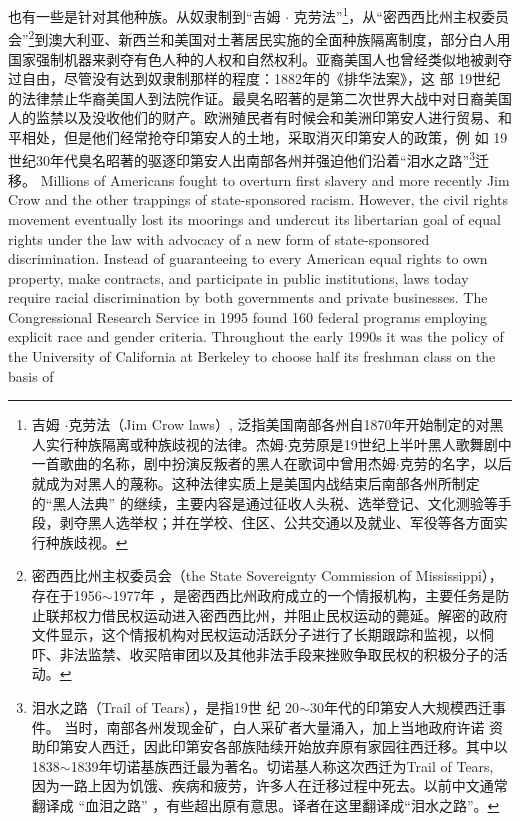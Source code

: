 \begin{paracol}{2}
也有一些是针对其他种族。从奴隶制到“吉姆 $\cdot$ 克劳法”\footnote{吉姆 $\cdot$克劳法（Jim Crow laws）, 泛指美国南部各州自1870年开始制定的对黑人实行种族隔离或种族歧视的法律。杰姆$\cdot$克劳原是19世纪上半叶黑人歌舞剧中一首歌曲的名称，剧中扮演反叛者的黑人在歌词中曾用杰姆$\cdot$克劳的名字，以后就成为对黑人的蔑称。这种法律实质上是美国内战结束后南部各州所制定的“黑人法典” 的继续，主要内容是通过征收人头税、选举登记、文化测验等手段，剥夺黑人选举权；并在学校、住区、公共交通以及就业、军役等各方面实行种族歧视。}，从“密西西比州主权委员会”\footnote{密西西比州主权委员会（the State Sovereignty Commission of Mississippi），存在于1956$\sim$1977年 ，是密西西比州政府成立的一个情报机构，主要任务是防止联邦权力借民权运动进入密西西比州，并阻止民权运动的薨延。解密的政府文件显示，这个情报机构对民权运动活跃分子进行了长期跟踪和监视，以恫吓、非法监禁、收买陪审团以及其他非法手段来挫败争取民权的积极分子的活动。}到澳大利亚、新西兰和美国对土著居民实施的全面种族隔离制度，部分白人用国家强制机器来剥夺有色人种的人权和自然权利。亚裔美国人也曾经类似地被剥夺过自由，尽管没有达到奴隶制那样的程度：1882年的《排华法案》，这 部 19世纪的法律禁止华裔美国人到法院作证。最臭名昭著的是第二次世界大战中对日裔美国人的监禁以及没收他们的财产。欧洲殖民者有时候会和美洲印第安人进行贸易、和平相处，但是他们经常抢夺印第安人的土地，采取消灭印第安人的政策，例 如 19世纪30年代臭名昭著的驱逐印第安人出南部各州并强迫他们沿着“泪水之路”\footnote{泪水之路（Trail of Tears），是指19世 纪 20$\sim$30年代的印第安人大规模西迁事件。 当时，南部各州发现金矿，白人采矿者大量涌入，加上当地政府许诺	资助印第安人西迁，因此印第安各部族陆续开始放弃原有家园往西迁移。其中以1838$\sim$1839年切诺基族西迁最为著名。切诺基人称这次西迁为Trail of Tears, 因为一路上因为饥饿、疾病和疲劳，许多人在迁移过程中死去。以前中文通常翻译成 “血泪之路” ，有些超出原有意思。译者在这里翻译成“泪水之路”。}迁移。
\switchcolumn*
Millions of Americans fought to overturn first slavery and
more recently Jim Crow and the other trappings of state-sponsored racism. However, the civil rights movement eventually
lost its moorings and undercut its libertarian goal of equal 
rights under the law with advocacy of a new form of state-sponsored discrimination. Instead of guaranteeing to every American equal rights to own property, make contracts, and
participate in public institutions, laws today require racial discrimination by both governments and private businesses. The
Congressional Research Service in 1995 found 160 federal programs employing explicit race and gender criteria. Throughout
the early 1990s it was the policy of the University of California
at Berkeley to choose half its freshman class on the basis of

\end{paracol}
